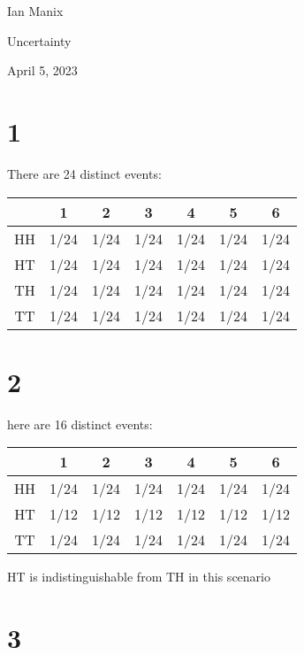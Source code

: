 \documentclass{article}
\begin{document}
    \begin{FlushLeft}
        Ian Manix

        Uncertainty

        April 5, 2023
    \end{FlushLeft}


    \section*{1}

    There are 24 distinct events: \\
    \begin{center}
    \begin{tabular} {| c | c | c | c | c | c | c |}
        \hline
        & 1 & 2 & 3 & 4 & 5 & 6 \\
        \hline
        HH & 1/24 & 1/24 & 1/24 & 1/24 & 1/24 & 1/24 \\
        \hline
        HT & 1/24 & 1/24 & 1/24 & 1/24 & 1/24 & 1/24 \\
        \hline
        TH & 1/24 & 1/24 & 1/24 & 1/24 & 1/24 & 1/24 \\
        \hline
        TT & 1/24 & 1/24 & 1/24 & 1/24 & 1/24 & 1/24 \\
        \hline
    \end{tabular}
    \end{center}


    \section*{2}

    here are 16 distinct events: \\
    \begin{center}
    \begin{tabular} {| c | c | c | c | c | c | c |}
        \hline
        & 1 & 2 & 3 & 4 & 5 & 6 \\
        \hline
        HH & 1/24 & 1/24 & 1/24 & 1/24 & 1/24 & 1/24 \\
        \hline
        HT & 1/12 & 1/12 & 1/12 & 1/12 & 1/12 & 1/12 \\
        \hline
        TT & 1/24 & 1/24 & 1/24 & 1/24 & 1/24 & 1/24 \\
        \hline
    \end{tabular}
    \end{center}
    HT is indistinguishable from TH in this scenario

    \section*{3}
   
\end{document}

